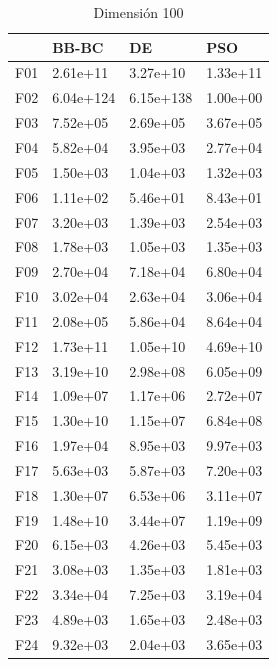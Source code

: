 \begin{table}[H]
\begin{minipage}{.5\linewidth}
    \end{minipage}%
    \begin{minipage}{.5\linewidth}
      \centering
      \caption{Dimensión 100}
      \begin{tabular}{llll}
        \toprule
        {} &      BB-BC &         DE &       PSO \\
        \midrule
        F01  &   2.61e+11 &   3.27e+10 &  1.33e+11 \\
        F02  &  6.04e+124 &  6.15e+138 &  1.00e+00 \\
        F03  &   7.52e+05 &   2.69e+05 &  3.67e+05 \\
        F04  &   5.82e+04 &   3.95e+03 &  2.77e+04 \\
        F05  &   1.50e+03 &   1.04e+03 &  1.32e+03 \\
        F06  &   1.11e+02 &   5.46e+01 &  8.43e+01 \\
        F07  &   3.20e+03 &   1.39e+03 &  2.54e+03 \\
        F08  &   1.78e+03 &   1.05e+03 &  1.35e+03 \\
        F09  &   2.70e+04 &   7.18e+04 &  6.80e+04 \\
        F10  &   3.02e+04 &   2.63e+04 &  3.06e+04 \\
        F11  &   2.08e+05 &   5.86e+04 &  8.64e+04 \\
        F12  &   1.73e+11 &   1.05e+10 &  4.69e+10 \\
        F13  &   3.19e+10 &   2.98e+08 &  6.05e+09 \\
        F14  &   1.09e+07 &   1.17e+06 &  2.72e+07 \\
        F15  &   1.30e+10 &   1.15e+07 &  6.84e+08 \\
        F16  &   1.97e+04 &   8.95e+03 &  9.97e+03 \\
        F17  &   5.63e+03 &   5.87e+03 &  7.20e+03 \\
        F18  &   1.30e+07 &   6.53e+06 &  3.11e+07 \\
        F19  &   1.48e+10 &   3.44e+07 &  1.19e+09 \\
        F20  &   6.15e+03 &   4.26e+03 &  5.45e+03 \\
        F21  &   3.08e+03 &   1.35e+03 &  1.81e+03 \\
        F22  &   3.34e+04 &   7.25e+03 &  3.19e+04 \\
        F23  &   4.89e+03 &   1.65e+03 &  2.48e+03 \\
        F24  &   9.32e+03 &   2.04e+03 &  3.65e+03 \\

\end{tabular}
\end{minipage}
\end{table}
